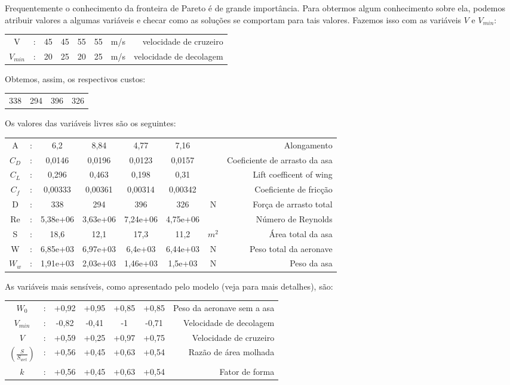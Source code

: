 Frequentemente o conhecimento da fronteira de Pareto é de grande
importância. Para obtermos algum conhecimento sobre ela, podemos
atribuir valores a algumas variáveis e checar como as soluções se
comportam para tais valores. Fazemos isso com as variáveis $V$ e
$V_{min}$:

\begin{tabular}{c c c c c c c r}
  V & : & 45 & 45 & 55 & 55 & m/s & velocidade de cruzeiro
  \\ $V_{min}$ & : & 20 & 25 & 20 & 25 & m/s & velocidade de decolagem
\end{tabular}

Obtemos, assim, os respectivos custos:

\begin{tabular}{c c c c}
  338 & 294 & 396 & 326
\end{tabular}

Os valores das variáveis livres são os seguintes:

\begin{tabular}{c c c c c c c r}
  A & : & 6,2 & 8,84 & 4,77 & 7,16 & & Alongamento \\ $C_D$ & : &
  0,0146 & 0,0196 & 0,0123 & 0,0157 & & Coeficiente de arrasto da asa
  \\ $C_L$ & : & 0,296 & 0,463 & 0,198 & 0,31 & & Lift coefficent of
  wing \\ $C_f$ & : & 0,00333 & 0,00361 & 0,00314 & 0,00342 & &
  Coeficiente de fricção \\ D & : & 338 & 294 & 396 & 326 & N & Força
  de arrasto total \\ Re & : & 5,38e+06 & 3,63e+06 & 7,24e+06 &
  4,75e+06 & & Número de Reynolds \\ S & : & 18,6 & 12,1 & 17,3 & 11,2
  & $m^2$ & Área total da asa \\ W & : & 6,85e+03 & 6,97e+03 & 6,4e+03
  & 6,44e+03 & N & Peso total da aeronave \\ $W_w$ & : & 1,91e+03 &
  2,03e+03 & 1,46e+03 & 1,5e+03 & N & Peso da asa \\
\end{tabular}

As variáveis mais sensíveis, como apresentado pelo modelo (veja
\cite{gpkit} para mais detalhes), são:

\begin{tabular}{c c c c c c r}
  $ W_0$ &: & +0,92 & +0,95 & +0,85 & +0,85 & Peso da aeronave sem a asa
  \\ $ V_{min}$ &: & -0,82 & -0,41 & -1 & -0,71 & Velocidade de
  decolagem \\ $ V$ &: & +0,59 & +0,25 & +0,97 & +0,75 & Velocidade de
  cruzeiro \\ $(\frac{S}{S_{wet}})$ &: & +0,56 & +0,45 & +0,63 & +0,54
  & Razão de área molhada \\ $ k$ &: & +0,56 & +0,45 & +0,63 & +0,54 &
  Fator de forma
\end{tabular}


